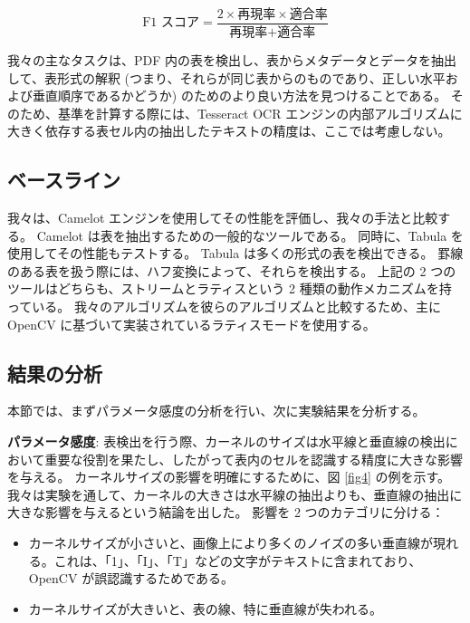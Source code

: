 \documentclass[uplatex, twocolumn,10pt]{jsarticle}
\begin{document}
\begin{equation}
    \text{F1 スコア} = \frac{2 \times \text{再現率} \times \text{適合率}}{\text{再現率} + \text{適合率}}
\end{equation}

我々の主なタスクは、PDF 内の表を検出し、表からメタデータとデータを抽出して、表形式の解釈 (つまり、それらが同じ表からのものであり、正しい水平および垂直順序であるかどうか) のためのより良い方法を見つけることである。
そのため、基準を計算する際には、Tesseract OCR エンジンの内部アルゴリズムに大きく依存する表セル内の抽出したテキストの精度は、ここでは考慮しない。

\subsection{ベースライン}
我々は、Camelot エンジンを使用してその性能を評価し、我々の手法と比較する。
Camelot は表を抽出するための一般的なツールである。
同時に、Tabula を使用してその性能もテストする。
Tabula は多くの形式の表を検出できる。
罫線のある表を扱う際には、ハフ変換によって、それらを検出する。
上記の 2 つのツールはどちらも、ストリームとラティスという 2 種類の動作メカニズムを持っている。
我々のアルゴリズムを彼らのアルゴリズムと比較するため、主に OpenCV に基づいて実装されているラティスモードを使用する。

\subsection{結果の分析}
本節では、まずパラメータ感度の分析を行い、次に実験結果を分析する。

\textbf{パラメータ感度}:
表検出を行う際、カーネルのサイズは水平線と垂直線の検出において重要な役割を果たし、したがって表内のセルを認識する精度に大きな影響を与える。
カーネルサイズの影響を明確にするために、図 \ref{fig4} の例を示す。
我々は実験を通して、カーネルの大きさは水平線の抽出よりも、垂直線の抽出に大きな影響を与えるという結論を出した。
影響を 2 つのカテゴリに分ける：

\begin{itemize}
    \item カーネルサイズが小さいと、画像上により多くのノイズの多い垂直線が現れる。これは、「1」、「I」、「T」などの文字がテキストに含まれており、OpenCV が誤認識するためである。
    \item カーネルサイズが大きいと、表の線、特に垂直線が失われる。
\end{itemize}
\end{document}

